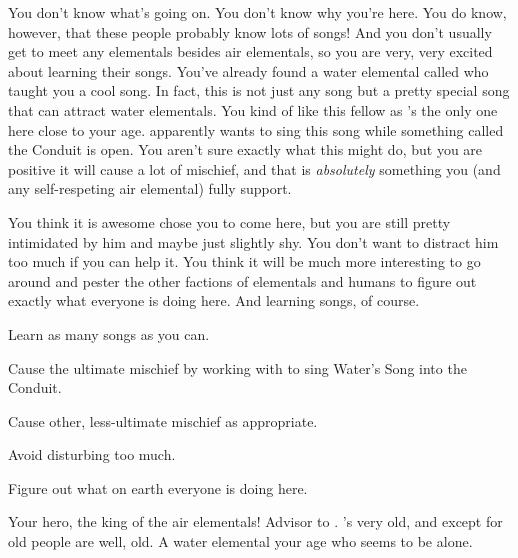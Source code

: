 \documentclass[char]{elementals}
\begin{document}
You don't know what's going on. You don't know why you're here. You do know, however, that these people probably know lots of songs! And you don't usually get to meet any elementals besides air elementals, so you are very, very excited about learning their songs. You've already found a water elemental called \cMiniWater{\intro} who taught you a cool song. In fact, this is not just any song but a pretty special song that can attract water elementals. You kind of like this \cMiniWater{} fellow as \cMiniWater{\they}'s the only one here close to your age. \cMiniWater{\They} apparently wants to sing this song while something called the Conduit is open. You aren't sure exactly what this might do, but you are positive it will cause a lot of mischief, and that is \emph{absolutely} something you (and any self-respeting air elemental) fully support.

You think it is awesome \cKing{} chose you to come here, but you are still pretty intimidated by him and maybe just slightly shy. You don't want to distract him too much if you can help it. You think it will be much more interesting to go around and pester the other factions of elementals and humans to figure out exactly what everyone is doing here. And learning songs, of course.

\begin{itemz}[Goals]
	\item  Learn as many songs as you can.
	\item  Cause the ultimate mischief by working with \cMiniWater{} to sing Water's Song into the Conduit.
	\item  Cause other, less-ultimate mischief as appropriate.
	\item  Avoid disturbing \cKing{} too much.
	\item  Figure out what on earth everyone is doing here.
\end{itemz}

\begin{contacts}
	\contact{\cKing{\intro}} Your hero, the king of the air elementals!
	\contact{\cNaturalist{\intro}} Advisor to \cKing{}. \cNaturalist{\They}'s very old, and except for \cKing{} old people are well, old.
	\contact{\cMiniWater{\intro}} A water elemental your age who seems to be alone.
\end{contacts} 
\end{document}
